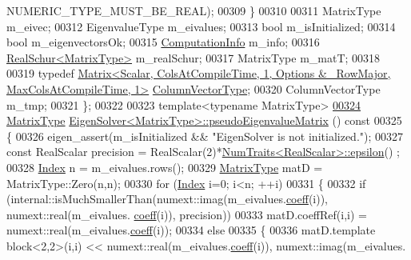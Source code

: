 \begin{DoxyCode}
      NUMERIC\_TYPE\_MUST\_BE\_REAL);
00309     \}
00310     
00311     MatrixType m\_eivec;
00312     EigenvalueType m\_eivalues;
00313     \textcolor{keywordtype}{bool} m\_isInitialized;
00314     \textcolor{keywordtype}{bool} m\_eigenvectorsOk;
00315     \hyperlink{group__enums_ga85fad7b87587764e5cf6b513a9e0ee5e}{ComputationInfo} m\_info;
00316     \hyperlink{group___eigenvalues___module}{RealSchur<MatrixType>} m\_realSchur;
00317     MatrixType m\_matT;
00318 
00319     \textcolor{keyword}{typedef} 
      \hyperlink{group___core___module}{Matrix<Scalar, ColsAtCompileTime, 1, Options & ~RowMajor, MaxColsAtCompileTime, 1>}
       \hyperlink{group___core___module}{ColumnVectorType};
00320     ColumnVectorType m\_tmp;
00321 \};
00322 
00323 \textcolor{keyword}{template}<\textcolor{keyword}{typename} MatrixType>
\hyperlink{group___eigenvalues___module_a4979eafe0aeef06b19ada7fa5e19db17}{00324} \hyperlink{group___eigenvalues___module_a83acd180404ddaac8a678fa65a6b632b}{MatrixType} \hyperlink{group___eigenvalues___module_a4979eafe0aeef06b19ada7fa5e19db17}{EigenSolver<MatrixType>::pseudoEigenvalueMatrix}
      ()\textcolor{keyword}{ const}
00325 \textcolor{keyword}{}\{
00326   eigen\_assert(m\_isInitialized && \textcolor{stringliteral}{"EigenSolver is not initialized."});
00327   \textcolor{keyword}{const} RealScalar precision = RealScalar(2)*\hyperlink{group___core___module_struct_eigen_1_1_num_traits}{NumTraits<RealScalar>::epsilon}()
      ;
00328   \hyperlink{group___eigenvalues___module_a5bff6a6bc0efac67d52c60c2c3deb9ee}{Index} n = m\_eivalues.rows();
00329   \hyperlink{group___eigenvalues___module_a83acd180404ddaac8a678fa65a6b632b}{MatrixType} matD = MatrixType::Zero(n,n);
00330   \textcolor{keywordflow}{for} (\hyperlink{group___eigenvalues___module_a5bff6a6bc0efac67d52c60c2c3deb9ee}{Index} i=0; i<n; ++i)
00331   \{
00332     \textcolor{keywordflow}{if} (internal::isMuchSmallerThan(numext::imag(m\_eivalues.\hyperlink{class_eigen_1_1_plain_object_base_afbfc12954f16d21aedb7bd839f64a278}{coeff}(i)), numext::real(m\_eivalues.
      \hyperlink{class_eigen_1_1_plain_object_base_afbfc12954f16d21aedb7bd839f64a278}{coeff}(i)), precision))
00333       matD.coeffRef(i,i) = numext::real(m\_eivalues.\hyperlink{class_eigen_1_1_plain_object_base_afbfc12954f16d21aedb7bd839f64a278}{coeff}(i));
00334     \textcolor{keywordflow}{else}
00335     \{
00336       matD.template block<2,2>(i,i) <<  numext::real(m\_eivalues.\hyperlink{class_eigen_1_1_plain_object_base_afbfc12954f16d21aedb7bd839f64a278}{coeff}(i)), numext::imag(m\_eivalues.

\end{DoxyCode}
